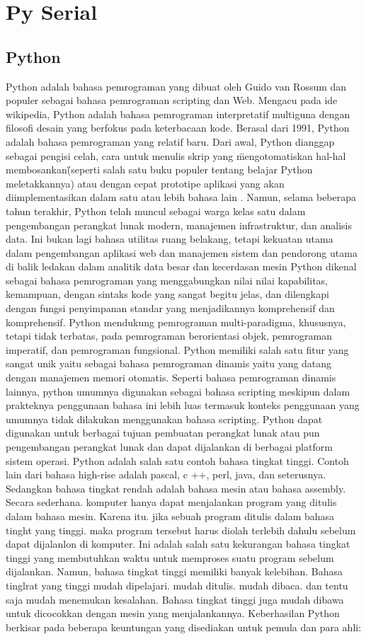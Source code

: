\section{Py Serial}

	\subsection{Python}
	Python adalah bahasa pemrograman yang dibuat oleh Guido van Rossum dan populer sebagai bahasa pemrograman scripting dan Web. Mengacu pada ide wikipedia, Python adalah bahasa pemrograman interpretatif multiguna dengan filosofi desain yang berfokus pada keterbacaan kode. 
	Berasal dari 1991, Python adalah bahasa pemrograman yang relatif baru. Dari awal, Python dianggap sebagai pengisi celah, cara untuk menulis skrip yang \"mengotomatiskan hal-hal membosankan\" (seperti salah satu buku populer tentang belajar Python meletakkannya) atau dengan cepat prototipe aplikasi yang akan diimplementasikan dalam satu atau lebih bahasa lain .
	Namun, selama beberapa tahun terakhir, Python telah muncul sebagai warga kelas satu dalam pengembangan perangkat lunak modern, manajemen infrastruktur, dan analisis data. Ini bukan lagi bahasa utilitas ruang belakang, tetapi kekuatan utama dalam pengembangan aplikasi web dan manajemen sistem dan pendorong utama di balik ledakan dalam analitik data besar dan kecerdasan mesin
	Python dikenal sebagai bahasa pemrograman yang menggabungkan nilai nilai kapabilitas, kemampuan, dengan sintaks kode yang sangat begitu jelas, dan dilengkapi dengan fungsi penyimpanan standar yang menjadikannya komprehensif dan komprehensif. 
	Python mendukung pemrograman multi-paradigma, khususnya, tetapi tidak terbatas, pada pemrograman berorientasi objek, pemrograman imperatif, dan pemrograman fungsional. 
	Python memiliki salah satu fitur yang sangat unik yaitu sebagai bahasa pemrograman dinamis yaitu yang datang dengan manajemen memori otomatis. Seperti bahasa 
	pemrograman dinamis lainnya, python umumnya digunakan sebagai bahasa scripting meskipun dalam prakteknya penggunaan bahasa ini lebih luas termasuk konteks penggunaan yang umumnya tidak dilakukan menggunakan bahasa scripting. 
	Python dapat digunakan untuk berbagai tujuan pembuatan perangkat lunak atau pun pengembangan perangkat lunak dan dapat dijalankan di berbagai platform sistem operasi. Python adalah salah satu contoh bahasa tingkat tinggi. 
	Contoh lain dari bahasa high-rise adalah pascal, c ++, perl, java, dan seterusnya. Sedangkan bahasa tingkat rendah adalah bahasa mesin atau bahasa assembly. 
	Secara sederhana. komputer hanya dapat menjalankan program yang ditulis dalam bahasa mesin. Karena itu. jika sebuah program ditulis dalam bahasa tinght yang tinggi. maka program tersebut harus diolah terlebih dahulu sebelum dapat dijalanlon di komputer. 
	Ini adalah salah satu kekurangan bahasa tingkat tinggi yang membutuhkan waktu untuk memproses suatu program sebelum dijalankan. Namun, bahasa tingkat tinggi memiliki banyak kelebihan. Bahasa tinglrat yang tinggi mudah dipelajari. mudah ditulis. mudah dibaca. dan tentu saja mudah menemukan kesalahan. Bahasa tingkat tinggi juga mudah dibawa untuk dicocokkan dengan mesin yang menjalankannya. 
	Keberhasilan Python berkisar pada beberapa keuntungan yang disediakan untuk pemula dan para ahli:
	
